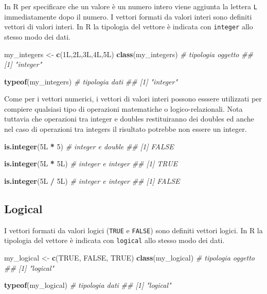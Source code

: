 \documentclass[
]{book}
\newenvironment{Shaded}{\begin{snugshade}}{\end{snugshade}}
\newcommand{\CommentTok}[1]{\textcolor[rgb]{0.56,0.35,0.01}{\textit{#1}}}
\newcommand{\DecValTok}[1]{\textcolor[rgb]{0.00,0.00,0.81}{#1}}
\newcommand{\KeywordTok}[1]{\textcolor[rgb]{0.13,0.29,0.53}{\textbf{#1}}}
\newcommand{\NormalTok}[1]{#1}
\newcommand{\OperatorTok}[1]{\textcolor[rgb]{0.81,0.36,0.00}{\textbf{#1}}}
\newcommand{\OtherTok}[1]{\textcolor[rgb]{0.56,0.35,0.01}{#1}}
\newcommand{\StringTok}[1]{\textcolor[rgb]{0.31,0.60,0.02}{#1}}
\begin{document}
In R per specificare che un valore è un numero intero viene aggiunta la lettera \texttt{L} immediatamente dopo il numero. I vettori formati da valori interi sono definiti vettori di valori interi. In R la tipologia del vettore è indicata con \texttt{integer} allo stesso modo dei dati.

\begin{Shaded}
\begin{Highlighting}[]
\NormalTok{my_integers <-}\StringTok{ }\KeywordTok{c}\NormalTok{(1L,2L,3L,4L,5L)}
\KeywordTok{class}\NormalTok{(my_integers)  }\CommentTok{# tipologia oggetto}
\CommentTok{## [1] "integer"}

\KeywordTok{typeof}\NormalTok{(my_integers) }\CommentTok{# tipologia dati}
\CommentTok{## [1] "integer"}
\end{Highlighting}
\end{Shaded}

Come per i vettori numerici, i vettori di valori interi possono esssere utilizzati per compiere qualsiasi tipo di operazioni matematiche o logico-relazionali. Nota tuttavia che operazioni tra integer e doubles restituiranno dei doubles ed anche nel caso di operazioni tra integers il risultato potrebbe non essere un integer.

\begin{Shaded}
\begin{Highlighting}[]
\KeywordTok{is.integer}\NormalTok{(5L }\OperatorTok{*}\StringTok{ }\DecValTok{5}\NormalTok{)   }\CommentTok{# integer e double}
\CommentTok{## [1] FALSE}

\KeywordTok{is.integer}\NormalTok{(5L }\OperatorTok{*}\StringTok{ }\NormalTok{5L)  }\CommentTok{# integer e integer}
\CommentTok{## [1] TRUE}

\KeywordTok{is.integer}\NormalTok{(5L }\OperatorTok{/}\StringTok{ }\NormalTok{5L)  }\CommentTok{# integer e integer}
\CommentTok{## [1] FALSE}
\end{Highlighting}
\end{Shaded}

\hypertarget{logical}{%
\subsection{Logical}\label{logical}}

I vettori formati da valori logici (\texttt{TRUE} e \texttt{FALSE}) sono definiti vettori logici. In R la tipologia del vettore è indicata con \texttt{logical} allo stesso modo dei dati.

\begin{Shaded}
\begin{Highlighting}[]
\NormalTok{my_logical <-}\StringTok{ }\KeywordTok{c}\NormalTok{(}\OtherTok{TRUE}\NormalTok{, }\OtherTok{FALSE}\NormalTok{, }\OtherTok{TRUE}\NormalTok{)}
\KeywordTok{class}\NormalTok{(my_logical)  }\CommentTok{# tipologia oggetto}
\CommentTok{## [1] "logical"}

\KeywordTok{typeof}\NormalTok{(my_logical) }\CommentTok{# tipologia dati}
\CommentTok{## [1] "logical"}
\end{Highlighting}
\end{Shaded}
\end{document}
